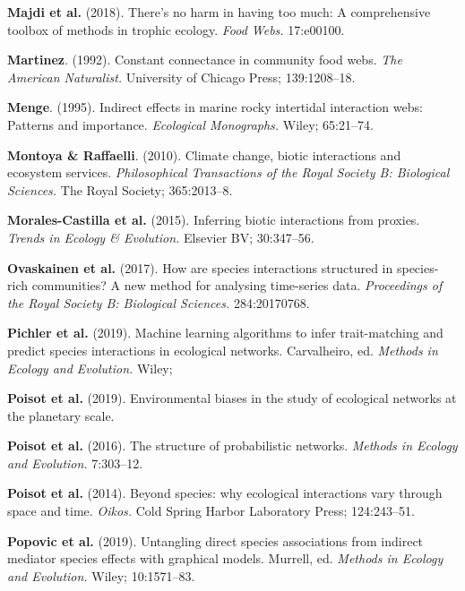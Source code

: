 \documentclass[
  12pt,
  a4paper,
  oneside]{report}
\begin{document}
\leavevmode\hypertarget{ref-Majdi_2018}{}%
\textbf{Majdi et al.} (2018). There's no harm in having too much: A
comprehensive toolbox of methods in trophic ecology. \emph{Food Webs.}
17:e00100.

\leavevmode\hypertarget{ref-Martinez_1992}{}%
\textbf{Martinez}. (1992). Constant connectance in community food webs.
\emph{The American Naturalist.} University of Chicago Press;
139:1208--18.

\leavevmode\hypertarget{ref-Menge_1995}{}%
\textbf{Menge}. (1995). Indirect effects in marine rocky intertidal
interaction webs: Patterns and importance. \emph{Ecological Monographs.}
Wiley; 65:21--74.

\leavevmode\hypertarget{ref-Montoya_2010}{}%
\textbf{Montoya \& Raffaelli}. (2010). Climate change, biotic
interactions and ecosystem services. \emph{Philosophical Transactions of
the Royal Society B: Biological Sciences.} The Royal Society;
365:2013--8.

\leavevmode\hypertarget{ref-Morales_Castilla_2015}{}%
\textbf{Morales-Castilla et al.} (2015). Inferring biotic interactions
from proxies. \emph{Trends in Ecology \& Evolution.} Elsevier BV;
30:347--56.

\leavevmode\hypertarget{ref-Ovaskainen_2017_procB}{}%
\textbf{Ovaskainen et al.} (2017). How are species interactions
structured in species-rich communities? A new method for analysing
time-series data. \emph{Proceedings of the Royal Society B: Biological
Sciences.} 284:20170768.

\leavevmode\hypertarget{ref-Pichler_2019}{}%
\textbf{Pichler et al.} (2019). Machine learning algorithms to infer
trait-matching and predict species interactions in ecological networks.
Carvalheiro, ed. \emph{Methods in Ecology and Evolution.} Wiley;

\leavevmode\hypertarget{ref-Poisot_2019}{}%
\textbf{Poisot et al.} (2019). Environmental biases in the study of
ecological networks at the planetary scale.

\leavevmode\hypertarget{ref-Poisot_2016}{}%
\textbf{Poisot et al.} (2016). The structure of probabilistic networks.
\emph{Methods in Ecology and Evolution.} 7:303--12.

\leavevmode\hypertarget{ref-Poisot_2014}{}%
\textbf{Poisot et al.} (2014). Beyond species: why ecological
interactions vary through space and time. \emph{Oikos.} Cold Spring
Harbor Laboratory Press; 124:243--51.

\leavevmode\hypertarget{ref-Popovic_2019}{}%
\textbf{Popovic et al.} (2019). Untangling direct species associations
from indirect mediator species effects with graphical models. Murrell,
ed. \emph{Methods in Ecology and Evolution.} Wiley; 10:1571--83.
\end{document}
